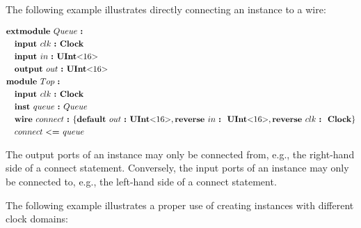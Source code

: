 \documentclass[12pt]{article}
\begin{document}
The following example illustrates directly connecting an instance to a wire:

{ \fontsize{11pt}{1.15em}\selectfont
\[
\begin{aligned}
&\kw{extmodule} Queue \ \kws{:} \\
&\quad \kw{input} clk  \ \kw{:} \kws{Clock} \\
&\quad \kw{input} in   \ \kw{:} \kws{UInt$<$}16\kws{$>$} \\
&\quad \kw{output} out \ \kw{:} \kws{UInt$<$}16\kws{$>$} \\
&\kw{module} Top \ \kws{:} \\
&\quad \kw{input} clk  \ \kw{:} \kws{Clock} \\
&\quad \kw{inst} queue \ \kw{:} Queue \\
&\quad \kw{wire} connect \ \kw{:} \bundleT{\kw{default} out \ \kw{:} \kws{UInt$<$}16\kws{$>$},\kw{reverse} in \ \kw{:} \ \kws{UInt$<$}16\kws{$>$},\kw{reverse} clk \ \kw{:} \ \kws{Clock}} \\
&\quad connect \ \kw{$<$=} queue \\
\end{aligned}
\]
}

The output ports of an instance may only be connected from, e.g., the right-hand side of a connect statement.
Conversely, the input ports of an instance may only be connected to, e.g., the left-hand side of a connect statement.

The following example illustrates a proper use of creating instances with different clock domains:
\end{document}

